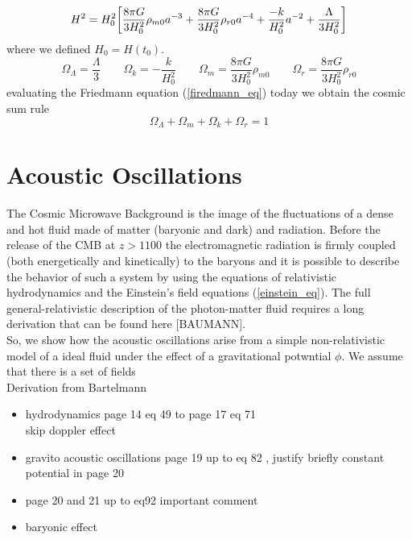 \documentclass{article}
\newcommand{\beq}{\begin{equation}}
\newcommand{\eeq}{\end{equation}}
\begin{document}
\begin{equation}
H ^2 = H_0 ^2 \qty[
\dfrac{8 \pi G}{3 H_0 ^2} \rho_{m 0} a^{-3}+
\dfrac{8 \pi G}{3 H_0 ^2} \rho_{r 0} a^{-4}+ 
\dfrac{-k}{H_0 ^2} a^{-2} + \dfrac{\Lambda}{3 H_0 ^2}
] \notag
\end{equation}
where we defined $H_0 = H(t_0)$.\\
\beq
\Omega_\Lambda = \dfrac{\Lambda}{3} \qquad \Omega_k = -  \dfrac{k}{H_0 ^2} \qquad
\Omega_m = \dfrac{8 \pi G}{3 H_0 ^2} \rho_{m 0} \qquad \Omega_r =\dfrac{8 \pi G}{3 H_0 ^2} \rho_{r 0}
\eeq
evaluating the Friedmann equation (\ref{firedmann_eq}) today we obtain the cosmic sum rule
\begin{equation}
\label{cosmic_rule}
\Omega_{\Lambda} + \Omega_{m} + \Omega_k + \Omega_{r} = 1
\end{equation}







\section{Acoustic Oscillations}
The Cosmic Microwave Background is the image of the fluctuations of a dense and hot fluid made of matter (baryonic and dark) and radiation.
Before the release of the CMB at $z > 1100$ the electromagnetic radiation is firmly coupled (both energetically and kinetically) to the baryons and it is possible to describe the behavior of such a system by using the equations of relativistic hydrodynamics and the Einstein's field equations (\ref{einstein_eq}).
The full general-relativistic description of the photon-matter fluid requires a long derivation that can be found here [BAUMANN].\\
So, we show how the acoustic oscillations arise from a simple non-relativistic model of a ideal fluid under the effect of a gravitational potwntial $\phi$.
We assume that there is a set of fields \\
Derivation from Bartelmann

\begin{itemize}
\item hydrodynamics \citep{huLectureNotesCMB2008}
page 14 eq 49 to page 17 eq 71\\
skip doppler effect
\item gravito acoustic oscillations page 19 up to eq 82 , justify briefly constant potential in page 20
\item page 20 and 21 up to eq92 important comment 
\item baryonic effect
\end{itemize}
\end{document}
